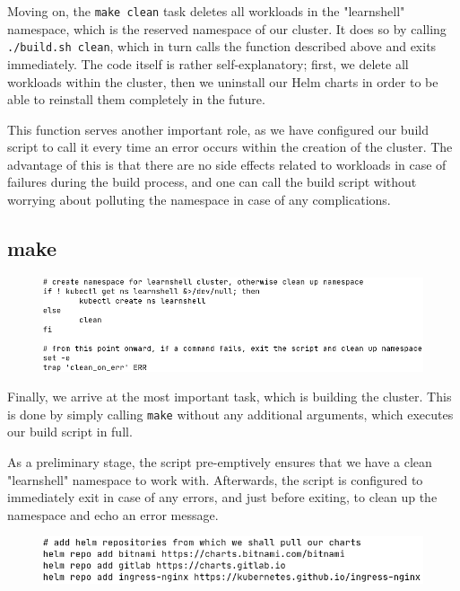 \documentclass[thesis=B,english]{FITthesis}[2019/12/23]
\begin{document}
Moving on, the \verb|make clean| task deletes all workloads in the "learnshell" namespace, which is the reserved namespace of our cluster. It does so by calling \verb|./build.sh clean|, which in turn calls the function described above and exits immediately. The code itself is rather self-explanatory; first, we delete all workloads within the cluster, then we uninstall our Helm charts in order to be able to reinstall them completely in the future.

This function serves another important role, as we have configured our build script to call it every time an error occurs within the creation of the cluster. The advantage of this is that there are no side effects related to workloads in case of failures during the build process, and one can call the build script without worrying about polluting the namespace in case of any complications.

\subsection{make}

\begin{figure}[H]
\centering
\hspace*{-0.5cm}
\includegraphics[scale=0.5]{build-namespace}
\end{figure}

Finally, we arrive at the most important task, which is building the cluster. This is done by simply calling \verb|make| without any additional arguments, which executes our build script in full. 

As a preliminary stage, the script pre-emptively ensures that we have a clean "learnshell" namespace to work with. Afterwards, the script is configured to immediately exit in case of any errors, and just before exiting, to clean up the namespace and echo an error message.

\begin{figure}[H]
\centering
\hspace*{-1.5cm}
\includegraphics[scale=0.5]{build-helm1}
\end{figure}
\end{document}
